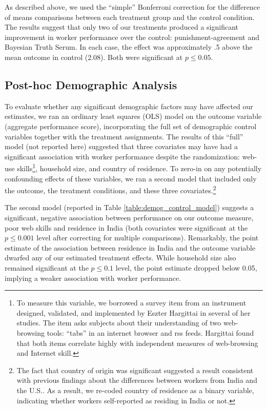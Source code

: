 \documentclass{chi2009}
\begin{document}
As described above, we used the ``simple'' Bonferroni correction for
the difference of means comparisons between each treatment group and
the control condition. The results suggest that only two of our
treatments produced a significant improvement in worker performance
over the control: punishment-agreement and Bayesian Truth Serum. In
each case, the effect was approximately .5 above the mean outcome in
control (2.08). Both were significant at $p \leq0.05$.


\subsection{Post-hoc Demographic Analysis}
To evaluate whether any significant demographic factors may have
affected our estimates, we ran an ordinary least squares (OLS) model
on the outcome variable (aggregate performance score), incorporating
the full set of demographic control variables together with the
treatment assignments. The results of this ``full'' model (not
reported here) suggested that three covariates may have had a
significant association with worker performance despite the
randomization: web-use skills\footnote{To measure this variable, we
  borrowed a survey item from an instrument designed, validated, and
  implemented by Eszter Hargittai in several of her
  studies.\cite{hargittai2009update} The item asks subjects about
  their understanding of two web-browsing tools: ``tabs'' in an
  internet browser and rss feeds. Hargittai found that both items
  correlate highly with independent measures of web-browsing and
  Internet skill.}, household size, and country of residence. To
zero-in on any potentially confounding effects of these variables, we
ran a second model that included only the outcome, the treatment
conditions, and these three covariates.\footnote{The fact that country
  of origin was significant suggested a result consistent with
  previous findings about the differences between workers from India
  and the U.S.\cite{ipeirotis2010}. As a result, we re-coded country
  of residence as a binary variable, indicating whether workers
  self-reported as residing in India or not.}

The second model (reported in Table \ref{table:demog_control_model}) suggests a significant, negative association between performance on our outcome measure, poor web skills and residence in India (both covariates were significant at the $p \leq 0.001$ level after correcting for multiple comparisons). Remarkably, the point estimate of the association between residence in India and the outcome variable dwarfed any of our estimated treatment effects. While household size also remained significant at the $p \leq 0.1$ level, the point estimate dropped below 0.05, implying a weaker association with worker performance.
\end{document}
